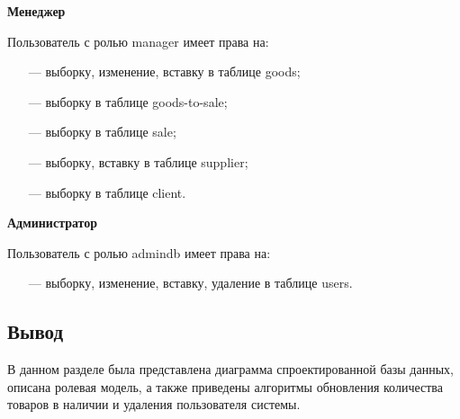 \textbf{Менеджер}

Пользователь с ролью manager имеет права на:

\begin{itemize}[leftmargin=0.7cm +  - ]
	\item[---] выборку, изменение, вставку в таблице goods;
	\item[---] выборку в таблице goods-to-sale;
	\item[---] выборку в таблице sale;
	\item[---] выборку, вставку в таблице supplier;
	\item[---] выборку в таблице client.
\end{itemize}

\textbf{Администратор}

Пользователь с ролью admindb имеет права на:

\begin{itemize}[leftmargin=0.7cm +  - ]
	\item[---] выборку, изменение, вставку, удаление в таблице users.
\end{itemize}

\subsection*{Вывод}

В данном разделе была представлена диаграмма спроектированной базы данных, описана ролевая модель, а также приведены алгоритмы обновления количества товаров в наличии и удаления пользователя системы.

\pagebreak